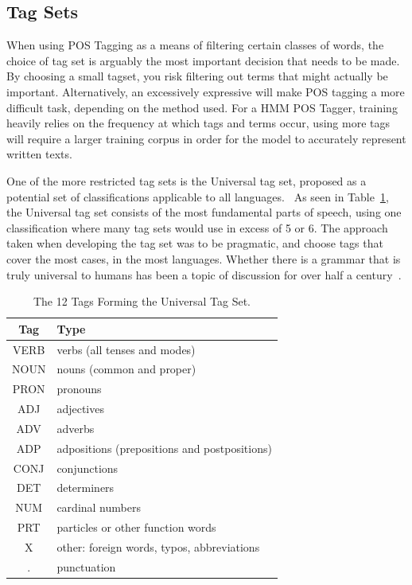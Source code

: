 \documentclass[10pt]{report}
\begin{document}
\subsection{Tag Sets}
When using POS Tagging as a means of filtering certain classes of words, the choice of tag set is arguably the most important decision that needs to be made. By choosing a small tagset, you risk filtering out terms that might actually be important. Alternatively, an excessively expressive will make POS tagging a more difficult task, depending on the method used. For a HMM POS Tagger, training heavily relies on the frequency at which tags and terms occur, using more tags will require a larger training corpus in order for the model to accurately represent written texts.

One of the more restricted tag sets is the Universal tag set, proposed as a potential set of classifications applicable to all languages.~\cite{DBLP:journals/corr/abs-1104-2086} As seen in Table~\ref{tab:universal_tags}, the Universal tag set consists of the most fundamental parts of speech, using one classification where many tag sets would use in excess of 5 or 6. The approach taken when developing the tag set was to be pragmatic, and choose tags that cover the most cases, in the most languages. Whether there is a grammar that is truly universal to humans has been a topic of discussion for over half a century~\cite{Dabrowska2015-qm}.

\renewcommand{\baselinestretch}{1.0}\normalsize
\renewcommand{\arraystretch}{1.0}
\begin{table}[h!]
  \centering
  \begin{tabular}{c | l}
    Tag & Type \\
    \hline
VERB & verbs (all tenses and modes)\\
NOUN & nouns (common and proper)\\
PRON & pronouns \\
ADJ & adjectives\\
ADV & adverbs\\
ADP & adpositions (prepositions and postpositions)\\
CONJ & conjunctions\\
DET & determiners\\
NUM & cardinal numbers\\
PRT & particles or other function words\\
X & other: foreign words, typos, abbreviations\\
. & punctuation\\
  \end{tabular}
  \caption{The 12 Tags Forming the Universal Tag Set.\label{tab:universal_tags}}
\end{table}
\renewcommand{\baselinestretch}{2.0}\normalsize
\renewcommand{\arraystretch}{1.0}
\end{document}
